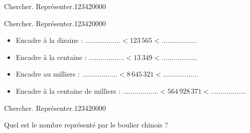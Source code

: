 \begin{pageParcoursu}
\begin{ExoCu}{Chercher. Représenter.}{1234}{2}{0}{0}{0}{0}
\end{ExoCu}


\begin{ExoCu}{Chercher. Représenter.}{1234}{2}{0}{0}{0}{0}

\begin{itemize}[leftmargin=*]
\item Encadre à la dizaine : $\ldots\ldots\ldots\ldots\ldots\ldots < 123\,565 < \ldots\ldots\ldots\ldots\ldots\ldots $ \vspace{0.2cm}
\item Encadre à la centaine : $\ldots\ldots\ldots\ldots\ldots\ldots < 13\,349 < \ldots\ldots\ldots\ldots\ldots\ldots $ \vspace{0.2cm}
\item Encadre au milliers : $\ldots\ldots\ldots\ldots\ldots\ldots <  8\,645\,321  < \ldots\ldots\ldots\ldots\ldots\ldots $ \vspace{0.2cm}
\item Encadre à la centaine de milliers  : $\ldots\ldots\ldots\ldots\ldots\ldots < 564\,928\,371 < \ldots\ldots\ldots\ldots\ldots\ldots $
\end{itemize}
\end{ExoCu}
 
\begin{ExoCu}{Chercher. Représenter.}{1234}{2}{0}{0}{0}{0}

\begin{minipage}{0.5\linewidth}
Quel est le nombre représenté par le boulier chinois ?
 

\end{minipage}
\end{ExoCu}
\end{pageParcoursu}
